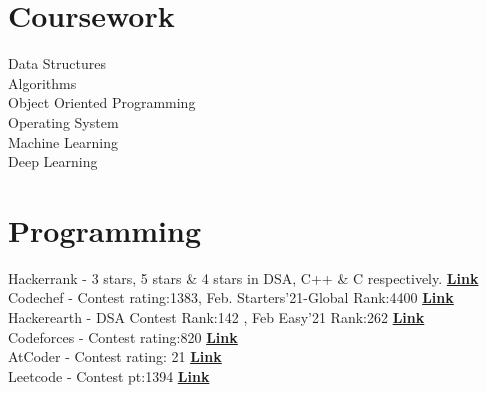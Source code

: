 \documentclass[]{deedy-resume-openfont}
\begin{document}
\begin{minipage}[t]{0.32\textwidth}
\section{Coursework}
\textbullet{}Data Structures \\
\textbullet{}Algorithms \\
\textbullet{}Object Oriented Programming\\
\textbullet{}Operating System \\ 
\textbullet{}Machine Learning \\
\textbullet{}Deep Learning\\

\sectionsep

\section{Programming}
\textbullet{}Hackerrank - 3 stars, 5 stars \& 4 stars in DSA, C++ \& C respectively. \href{https://www.hackerrank.com/priyankasoni0191}{\bf Link}\\
\textbullet{}Codechef - Contest rating:1383, Feb. Starters'21-Global Rank:4400 \href{https://www.codechef.com/users/priyanka_1507}{\bf Link}\\
\textbullet{}Hackerearth - DSA Contest Rank:142 , Feb Easy'21 Rank:262 \href{http://www.hackerearth.com/@priyanka2228}{\bf Link}\\
\textbullet{}Codeforces - Contest rating:820 \href{https://codeforces.com/profile/PS1507}{\bf Link} \\
\textbullet{}AtCoder - Contest rating: 21 \href{https://atcoder.jp/users/PSoni}{\bf Link}\\
\textbullet{}Leetcode - Contest pt:1394 \href{https://leetcode.com/priyanka_1507/}{\bf Link}\\




\end{minipage} 
\hfill
\end{document}
